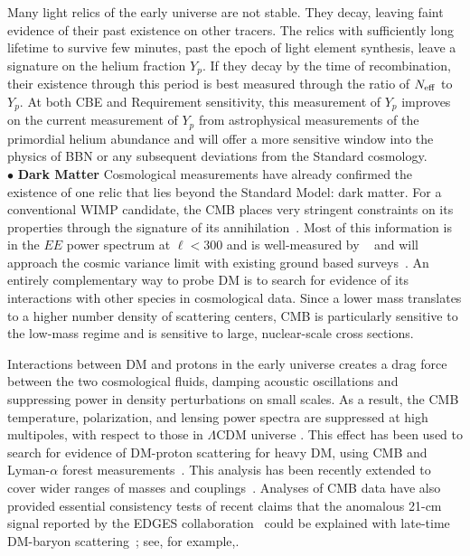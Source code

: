 \documentclass[PICOReport.tex]{subfiles}
\begin{document}
Many light relics of the early universe are not stable. They decay, leaving faint evidence of their past existence on other tracers. The relics with sufficiently long lifetime to survive few minutes, past the epoch of light element synthesis, leave a signature on the helium fraction $Y_p$.  If they decay by the time of recombination, their existence through this period is best measured through the ratio of ${N_{\rm eff}}$ to $Y_p$. At both CBE and Requirement sensitivity, this measurement of $Y_p$ improves on the current measurement of $Y_p$ from astrophysical measurements of the primordial helium abundance and will offer a more sensitive window into the physics of BBN or any subsequent deviations from the Standard cosmology.  \\
$\bullet$ {\bf Dark Matter} \hspace{0.1in} Cosmological measurements have already confirmed the existence of one relic that lies beyond the Standard Model: dark matter. For a conventional WIMP candidate, the CMB places very stringent constraints on its properties through the signature of its annihilation~\cite{Peebles:2000pn, Chen:2003gz, Padmanabhan:2005es}. Most of this information is in the $EE$ power spectrum at $\ell < 300$ and is well-measured by \planck~ and will approach the cosmic variance limit with existing ground based surveys~\cite{Madhavacheril:2013cna,Green:2018pmd}.  An entirely complementary way to probe DM is to search for evidence of its interactions with other species in cosmological data. Since a lower mass translates to a higher number density of scattering centers, CMB is particularly sensitive to the low-mass regime and is sensitive to large, nuclear-scale cross sections. 
 
Interactions between DM and protons in the early universe creates a drag force between the two cosmological fluids, damping acoustic oscillations and suppressing power in density perturbations on small scales. As a result, the CMB temperature, polarization, and lensing power spectra are suppressed at high multipoles, with respect to those in $\Lambda$CDM universe . This effect has been used to search for evidence of DM-proton scattering for heavy DM, using CMB and Lyman-$\alpha$ forest measurements~\citep{2002astro.ph..2496C,2004PhRvD..70h3501S,Dvorkin:2013cea}. This analysis has been recently extended to cover wider ranges of masses and couplings~\citep{2018PhRvL.121h1301G,2018arXiv180108609B,2018PhRvD..97j3530X,2018arXiv180800001B, 2018PhRvD..98b3013S}.  Analyses of CMB data have also provided essential consistency tests of recent claims that the anomalous 21-cm signal reported by the EDGES collaboration~\citep{2018Natur.555...67B} could be explained with late-time DM-baryon scattering~\citep{2018Natur.555...71B}; see, for example,\citet{2018arXiv180711482K,2018PhRvD..98b3013S}. 
\end{document}

